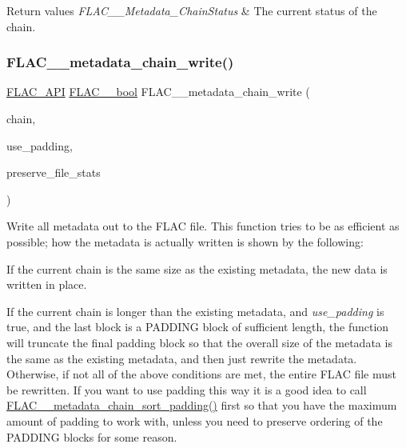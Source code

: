 \begin{DoxyRetVals}{Return values}
{\em F\+L\+A\+C\+\_\+\+\_\+\+Metadata\+\_\+\+Chain\+Status} & The current status of the chain. \\
\hline
\end{DoxyRetVals}
\mbox{\label{group__flac__metadata__level2_gaa15ead7230217de8e79f4af822cda490}} 
\subsubsection{\texorpdfstring{FLAC\_\_metadata\_chain\_write()}{FLAC\_\_metadata\_chain\_write()}}
{\footnotesize\ttfamily \mbox{\hyperlink{group__flac__export_ga56ca07df8a23310707732b1c0007d6f5}{F\+L\+A\+C\+\_\+\+A\+PI}} \mbox{\hyperlink{ordinals_8h_a95103469f1cbd78b8cf250194985b34e}{F\+L\+A\+C\+\_\+\+\_\+bool}} F\+L\+A\+C\+\_\+\+\_\+metadata\+\_\+chain\+\_\+write (\begin{DoxyParamCaption}\item[{\mbox{\hyperlink{group__flac__metadata__level2_gaec6993c60b88f222a52af86f8f47bfdf}{F\+L\+A\+C\+\_\+\+\_\+\+Metadata\+\_\+\+Chain}} $\ast$}]{chain,  }\item[{\mbox{\hyperlink{ordinals_8h_a95103469f1cbd78b8cf250194985b34e}{F\+L\+A\+C\+\_\+\+\_\+bool}}}]{use\+\_\+padding,  }\item[{\mbox{\hyperlink{ordinals_8h_a95103469f1cbd78b8cf250194985b34e}{F\+L\+A\+C\+\_\+\+\_\+bool}}}]{preserve\+\_\+file\+\_\+stats }\end{DoxyParamCaption})}

Write all metadata out to the F\+L\+AC file. This function tries to be as efficient as possible; how the metadata is actually written is shown by the following\+:

If the current chain is the same size as the existing metadata, the new data is written in place.

If the current chain is longer than the existing metadata, and {\itshape use\+\_\+padding} is {\ttfamily true}, and the last block is a P\+A\+D\+D\+I\+NG block of sufficient length, the function will truncate the final padding block so that the overall size of the metadata is the same as the existing metadata, and then just rewrite the metadata. Otherwise, if not all of the above conditions are met, the entire F\+L\+AC file must be rewritten. If you want to use padding this way it is a good idea to call \mbox{\hyperlink{group__flac__metadata__level2_gaa14304da1c8e706808cfafa5cbbf575b}{F\+L\+A\+C\+\_\+\+\_\+metadata\+\_\+chain\+\_\+sort\+\_\+padding()}} first so that you have the maximum amount of padding to work with, unless you need to preserve ordering of the P\+A\+D\+D\+I\+NG blocks for some reason.

